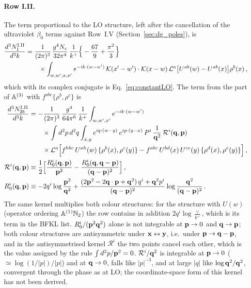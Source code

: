\paragraph{Row I.II.} The term proportional to the LO structure, left after the cancellation of the ultraviolet $\beta_0$ terms against Row~I.V (Section~\ref{sec:dg_poles}), is
\begin{align}\label{eq:app_IIa}
\frac{d^3N^{\rm I.II}_1}{d^3k}&=\frac{1}{(2\pi)^3}\,\frac{g^4N_c}{32\pi^4}\,\frac{1}{k^+}\Big\{-\frac{67}{9}+\frac{\pi^2}{3}\Big\}\notag\\&\qquad\times\int_{w,w',x,x'}e^{-ik\cdot(w-w')}\,\mathcal{K}(x'-w')\cdot\mathcal{K}(x-w)\,\mathcal L^a\big[U^{ab}(w)-U^{ab}(x)\big]\rho^b(x)\,,
\end{align}
which with its complex conjugate is Eq.~\eqref{eq:constantLO}. The term from the part of $\mathbb{A}^{(3)}$ with $f^{abc}\{\rho^b,\rho^c\}$ is
\begin{align}\label{eq:app_IIb}
\frac{d^3N^{\rm I.II}_{2b}}{d^3k}&=-\frac{1}{(2\pi)^3}\,\frac{g^4}{64\pi^6}\,\frac{1}{k^+}\int_{w,w',x'}e^{-ik\cdot(w-w')}\notag\\&\qquad\times\int d^2p\,d^2q\int_{x,y}e^{iq\cdot(w-y)}\,e^{ip\cdot(y-x)}\,P^i\,\frac{1}{\mathbf{q}^2}\,\mathcal R^i(\mathbf{q},\mathbf{p})\notag\\
&\qquad\times\mathcal L^a\Big[f^{hbc}\,U^{ah}(w)\,\{\rho^b(x),\rho^c(y)\}-f^{abc}\,U^{bd}(x)\,U^{ce}(y)\,\{\rho^d(x),\rho^e(y)\}\Big]\,,\notag\\
\mathcal R^i(\mathbf{q},\mathbf{p})&\equiv\frac12\Big[\frac{R_0^i(\mathbf{q},\mathbf{p})}{\mathbf{p}^2}-\frac{R_0^i(\mathbf{q},\mathbf{q}-\mathbf{p})}{(\mathbf{q}-\mathbf{p})^2}\Big]\,,\notag\\
R_0^i(\mathbf{q},\mathbf{p})&\equiv-2q^i\log\frac{\mathbf{p}^2}{\mathbf{q}^2}+\frac{(2\mathbf{p}^2-2\mathbf{q}\cdot\mathbf{p}+\mathbf{q}^2)\,q^i+\mathbf{q}^2p^i}{(\mathbf{q}-\mathbf{p})^2}\log\frac{\mathbf{q}^2}{(\mathbf{q}-\mathbf{p})^2}\,.
\end{align}
The same kernel multiplies both colour structures: for the structure with $U(w)$ (operator ordering $\mathbb{A}^{(1)}\mathbb{N}_2$) the row contains in addition $2q^i\log\frac{\vee}{k^+}$, which is its term in the BFKL list. $R_0^i/(\mathbf{p}^2\mathbf{q}^2)$ alone is not integrable at $\mathbf{p}\to0$ and $\mathbf{q}\to\mathbf{p}$; both colour structures are antisymmetric under $\mathbf{x}\leftrightarrow\mathbf{y}$, i.e.\ under $\mathbf{p}\to\mathbf{q}-\mathbf{p}$, and in the antisymmetrised kernel $\mathcal R^i$ the two points cancel each other, which is the value assigned by the rule $\int d^2p/\mathbf{p}^2=0$. $\mathcal R^i/\mathbf{q}^2$ is integrable at $\mathbf{p}\to0$ ($\simeq\log(1/|p|)/|p|$) and at $\mathbf{q}\to0$, falls like $|p|^{-3}$, and at large $|q|$ like $\log\mathbf{q}^2/\mathbf{q}^2$, convergent through the phase as at LO; the coordinate-space form of this kernel has not been derived.

